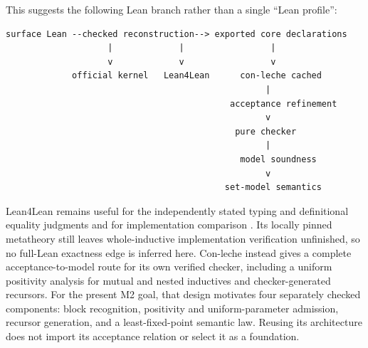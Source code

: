 \documentclass[11pt,a4paper]{article}
\theoremstyle{plain}
\theoremstyle{definition}
\theoremstyle{remark}
\begin{document}
This suggests the following Lean branch rather than a single ``Lean profile'':

\begin{center}
\begin{minipage}{0.82\linewidth}
\begin{verbatim}
surface Lean --checked reconstruction--> exported core declarations
                    |             |                 |
                    v             v                 v
             official kernel   Lean4Lean      con-leche cached
                                                   |
                                            acceptance refinement
                                                   v
                                             pure checker
                                                   |
                                              model soundness
                                                   v
                                           set-model semantics
\end{verbatim}
\end{minipage}
\end{center}
\par\medskip

Lean4Lean remains useful for the independently stated typing and definitional
equality judgments and for implementation comparison \cite{Lean4Lean}. Its
locally pinned metatheory still leaves whole-inductive implementation
verification unfinished, so no full-Lean exactness edge is inferred here.
Con-leche instead gives a complete acceptance-to-model route for its own
verified checker, including a uniform positivity analysis for mutual and
nested inductives and checker-generated recursors. For the present M2 goal,
that design motivates four separately checked components: block recognition,
positivity and uniform-parameter admission, recursor generation, and a
least-fixed-point semantic law. Reusing its architecture does not import its
acceptance relation or select it as a foundation.
\end{document}
